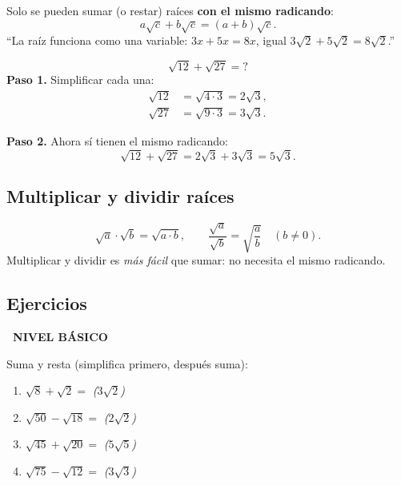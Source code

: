 \documentclass[11pt,a4paper]{article}
\newcommand{\nivelbasico}{%
  \par\smallskip\colorbox{green!60!black}{\color{white}\small\bfseries\ NIVEL BÁSICO\ }\par\smallskip}
\begin{document}
\begin{tcolorbox}[propiedad, title=Regla]
Solo se pueden sumar (o restar) raíces \textbf{con el mismo radicando}:
\[
  a\sqrt{c} + b\sqrt{c} = (a + b)\sqrt{c}.
\]
``La raíz funciona como una variable: $3x + 5x = 8x$, igual $3\sqrt{2} + 5\sqrt{2} = 8\sqrt{2}$.''
\end{tcolorbox}

\begin{tcolorbox}[ejemplo, title=Caso clave: parecen distintas pero no lo son]
\[
  \sqrt{12} + \sqrt{27} = ?
\]
\textbf{Paso 1.} Simplificar cada una:
\begin{align*}
  \sqrt{12} &= \sqrt{4 \cdot 3} = 2\sqrt{3}, \\
  \sqrt{27} &= \sqrt{9 \cdot 3} = 3\sqrt{3}.
\end{align*}

\textbf{Paso 2.} Ahora sí tienen el mismo radicando:
\[
  \sqrt{12} + \sqrt{27} = 2\sqrt{3} + 3\sqrt{3} = 5\sqrt{3}.
\]
\end{tcolorbox}

\subsection{Multiplicar y dividir raíces}

\begin{tcolorbox}[propiedad, title=Reglas]
\[
  \sqrt{a} \cdot \sqrt{b} = \sqrt{a \cdot b}, \qquad
  \frac{\sqrt{a}}{\sqrt{b}} = \sqrt{\frac{a}{b}} \quad (b \neq 0).
\]
Multiplicar y dividir es \emph{más fácil} que sumar: no necesita el mismo radicando.
\end{tcolorbox}

\subsection{Ejercicios}

\nivelbasico

Suma y resta (simplifica primero, después suma):
\begin{enumerate}[label=\textbf{\arabic*.},leftmargin=1cm,itemsep=8pt]
  \item $\sqrt{8} + \sqrt{2} = $ \hfill \textit{($3\sqrt{2}$)}
  \item $\sqrt{50} - \sqrt{18} = $ \hfill \textit{($2\sqrt{2}$)}
  \item $\sqrt{45} + \sqrt{20} = $ \hfill \textit{($5\sqrt{5}$)}
  \item $\sqrt{75} - \sqrt{12} = $ \hfill \textit{($3\sqrt{3}$)}
\end{enumerate}
\end{document}

